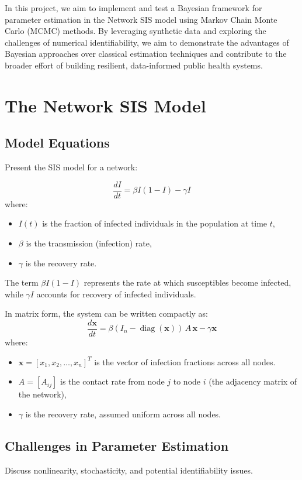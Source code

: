 \documentclass[a4paper,10pt]{report}
\begin{document}
In this project, we aim to implement and test a Bayesian framework for parameter estimation in the Network SIS model using Markov Chain Monte Carlo (MCMC) methods. By leveraging synthetic data and exploring the challenges of numerical identifiability, we aim to demonstrate the advantages of Bayesian approaches over classical estimation techniques and contribute to the broader effort of building resilient, data-informed public health systems.


\section{The Network SIS Model}
\subsection{Model Equations}
Present the SIS model for a network:

\[
\boxed{
\frac{dI}{dt} = \beta I (1 - I) - \gamma I
}
\]
where:
\begin{itemize}
    \item $I(t)$ is the fraction of infected individuals in the population at time $t$,
    \item $\beta$ is the transmission (infection) rate,
    \item $\gamma$ is the recovery rate.
\end{itemize}

The term $\beta I (1 - I)$ represents the rate at which susceptibles become infected, while $\gamma I$ accounts for recovery of infected individuals.



In matrix form, the system can be written compactly as:
\[
\boxed{
\frac{d\mathbf{x}}{dt} = \beta (I_n-\operatorname{diag}(\mathbf{x})) \, A \, \mathbf{x} - \gamma \mathbf{x}
}
\]
where: 
\begin{itemize}
    \item $\mathbf{x} = [x_1, x_2, \dots, x_n]^T$ is the vector of infection fractions across all nodes.
    \item $A = [A_{ij}]$ is the contact rate from node $j$ to node $i$ (the adjacency matrix of the network),
    \item $\gamma$ is the recovery rate, assumed uniform across all nodes.
\end{itemize}


\subsection{Challenges in Parameter Estimation}
Discuss nonlinearity, stochasticity, and potential identifiability issues.
\end{document}
